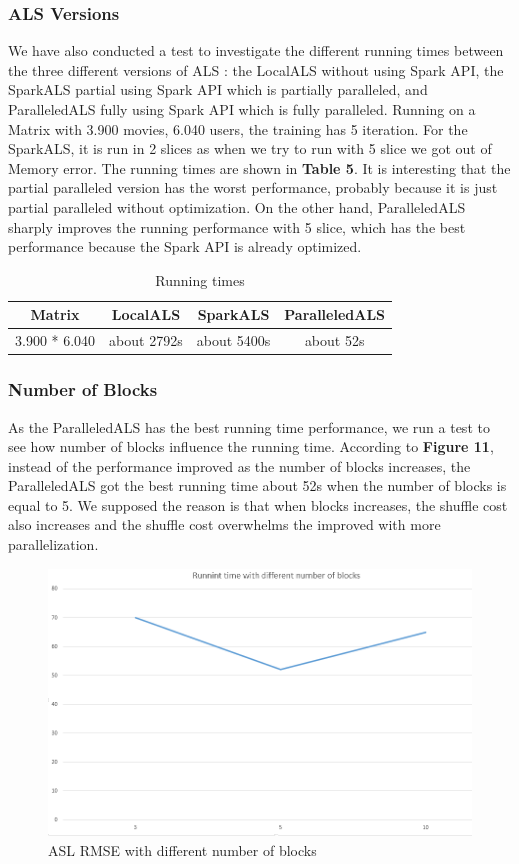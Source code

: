 \documentclass{sig-alternate-05-2015}
\begin{document}
    \subsubsection{ALS Versions}
     We have also conducted a test to investigate the different running times between the three different versions of ALS : the LocalALS without using Spark API, the SparkALS partial using Spark API which is partially paralleled, and ParalleledALS fully using Spark API which is fully paralleled. Running on a Matrix with 3.900 movies, 6.040 users, the training has 5 iteration. For the SparkALS, it is run in 2 slices as when we try to run with 5 slice we got out of Memory error. The running times are shown in \textbf{Table 5}. It is interesting that the partial paralleled version has the worst performance, probably because it is just partial paralleled without optimization. On the other hand, ParalleledALS sharply improves the running performance with 5 slice, which has the best performance because the Spark API is already optimized.
\begin{table}
\centering
\caption{Running times}
\begin{tabular}{|c|c|c|c|} \hline
\textbf{Matrix}  & \textbf{LocalALS} & \textbf{SparkALS} & \textbf{ParalleledALS}\\ \hline
3.900 * 6.040 & about 2792s  & about 5400s & about 52s\\ \hline
\end{tabular}
\end{table}
\subsubsection{Number of Blocks}
    As the ParalleledALS has the best running time performance, we run a test to see how number of blocks influence the running time. According to \textbf{Figure 11}, instead of the performance improved as the number of blocks increases, the  ParalleledALS got the best running time about 52s when the number of blocks is equal to 5. We supposed the reason is that when blocks increases, the shuffle cost also increases and the shuffle cost overwhelms the improved with more parallelization.

        \begin{figure}
    \caption{ASL RMSE with different number of blocks}
    \centering
    \includegraphics[scale=0.4]{alsblock.png}
\end{figure}
\end{document}
